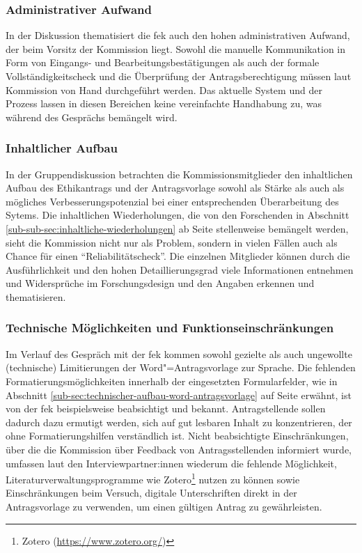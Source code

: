 \documentclass[a4paper,12pt,twoside]{scrreprt}
\begin{document}
\subsubsection*{Administrativer Aufwand}
\label{sub-sub-sec:administrativer-aufwand}

In der Diskussion thematisiert die \ac{fek} auch den hohen administrativen Aufwand, der beim Vorsitz der Kommission liegt. Sowohl die manuelle Kommunikation in Form von Eingangs- und Bearbeitungsbestätigungen als auch der formale Vollständigkeitscheck und die Überprüfung der Antragsberechtigung müssen laut Kommission von Hand durchgeführt werden. Das aktuelle System und der Prozess lassen in diesen Bereichen keine vereinfachte Handhabung zu, was während des Gesprächs bemängelt wird.

\subsubsection*{Inhaltlicher Aufbau}
\label{sub-sub-sec:inhaltlicher-aufbau}

In der Gruppendiskussion betrachten die Kommissionsmitglieder den inhaltlichen Aufbau des Ethikantrags und der Antragsvorlage sowohl als Stärke als auch als mögliches Verbesserungspotenzial bei einer entsprechenden Überarbeitung des Sytems. Die inhaltlichen Wiederholungen, die von den Forschenden in Abschnitt \ref{sub-sub-sec:inhaltliche-wiederholungen} ab Seite \pageref{sub-sub-sec:inhaltliche-wiederholungen} stellenweise bemängelt werden, sieht die Kommission nicht nur als Problem, sondern in vielen Fällen auch als Chance für einen \enquote{Reliabilitätscheck}. Die einzelnen Mitglieder können durch die Ausführlichkeit und den hohen Detaillierungsgrad viele Informationen entnehmen und Widersprüche im Forschungsdesign und den Angaben erkennen und thematisieren.

\subsubsection*{Technische Möglichkeiten und Funktionseinschränkungen }
\label{sub-sub-sec:möglichkeiten-funktionseinschränkungen}

Im Verlauf des Gespräch mit der \acl{fek} kommen sowohl gezielte als auch ungewollte (technische) Limitierungen der Word"=Antragsvorlage zur Sprache. Die fehlenden Formatierungsmöglichkeiten innerhalb der eingesetzten Formularfelder, wie in Abschnitt \ref{sub-sec:technischer-aufbau-word-antragsvorlage} auf Seite \pageref{sub-sec:technischer-aufbau-word-antragsvorlage} erwähnt, ist von der \ac{fek} beispielsweise beabsichtigt und bekannt. Antragstellende sollen dadurch dazu ermutigt werden, sich auf gut lesbaren Inhalt zu konzentrieren, der ohne Formatierungshilfen verständlich ist. Nicht beabsichtigte Einschränkungen, über die die Kommission über Feedback von Antragsstellenden informiert wurde, umfassen laut den Interviewpartner:innen wiederum die fehlende Möglichkeit, Literaturverwaltungsprogramme wie Zotero\footnote{Zotero (\url{https://www.zotero.org/})} nutzen zu können sowie Einschränkungen beim Versuch, digitale Unterschriften direkt in der Antragsvorlage zu verwenden, um einen gültigen Antrag zu gewährleisten.
\end{document}
